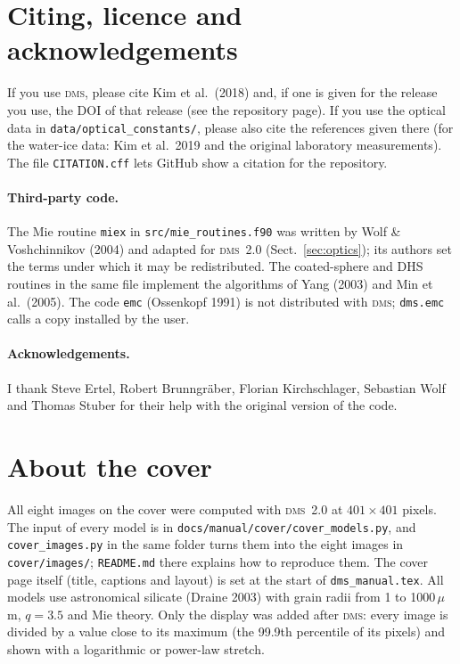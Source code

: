 \documentclass[11pt,a4paper]{article}
\newcommand{\dms}{\textsc{dms}}
\newcommand{\code}[1]{\texttt{#1}}
\newcommand{\um}{\,$\mu$m}
\begin{document}
\section{Citing, licence and acknowledgements}
\label{sec:cite}

If you use \dms, please cite Kim et al.\ (2018) and, if one is given for the release you use, the
DOI of that release (see the repository page). If you use the optical data in
\code{data/}\allowbreak\code{optical\_constants/}, please also cite the references given there (for the water-ice
data: Kim et al.\ 2019 and the original laboratory measurements). The file \code{CITATION.cff}
lets GitHub show a citation for the repository.

\paragraph{Third-party code.} The Mie routine \code{miex} in \code{src/mie\_routines.f90} was
written by Wolf \& Voshchinnikov (2004) and adapted for \dms\ 2.0 (Sect.~\ref{sec:optics}); its
authors set the terms under which it may be redistributed. The coated-sphere and DHS routines in the
same file implement the algorithms of Yang (2003) and Min et al.\ (2005). The
code \code{emc} (Ossenkopf 1991) is not distributed with \dms; \code{dms.emc} calls a copy
installed by the user.

\paragraph{Acknowledgements.} I thank Steve Ertel, Robert Brunngr\"aber, Florian Kirchschlager,
Sebastian Wolf and Thomas Stuber for their help with the original version of the code.

\section*{About the cover}
\label{sec:cover}

All eight images on the cover were computed with \dms\ 2.0 at $401\times401$ pixels. The input of
every model is in \code{docs/}\allowbreak\code{manual/}\allowbreak\code{cover/}\allowbreak\code{cover\_models.py},
and \code{cover\_images.py} in the same folder turns them into the eight images in
\code{cover/}\allowbreak\code{images/}; \code{README.md} there explains how to reproduce them. The
cover page itself (title, captions and layout) is set at the start of \code{dms\_manual.tex}. All models use astronomical silicate (Draine 2003) with grain radii from 1 to
1000\um, $q=3.5$ and Mie theory. Only the display was added after \dms: every image is divided by
a value close to its maximum (the 99.9th percentile of its pixels) and shown with a logarithmic or
power-law stretch.
\end{document}

